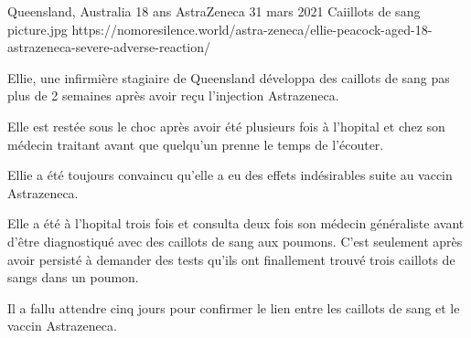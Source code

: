 {Queensland, Australia}
{18 ans}
{AstraZeneca}
{31 mars 2021}
{Caiillots de sang}
{picture.jpg}
{https://nomoresilence.world/astra-zeneca/ellie-peacock-aged-18-astrazeneca-severe-adverse-reaction/}
{

Ellie, une infirmière stagiaire de Queensland développa des caillots de sang pas
plus de 2 semaines après avoir reçu l'injection Astrazeneca.

Elle est restée sous le choc après avoir été plusieurs fois à l'hopital et chez
son médecin traitant avant que quelqu'un prenne le temps de l'écouter.

Ellie a été toujours convaincu qu'elle a eu des effets indésirables suite au
vaccin Astrazeneca.

Elle a été à l'hopital trois fois et consulta deux fois son médecin généraliste
avant d'être diagnostiqué avec des caillots de sang aux poumons. C'est seulement
après avoir persisté à demander des tests qu'ils ont finallement trouvé trois
caillots de sangs dans un poumon.

Il a fallu attendre cinq jours pour confirmer le lien entre les caillots de sang
et le vaccin Astrazeneca.

}
